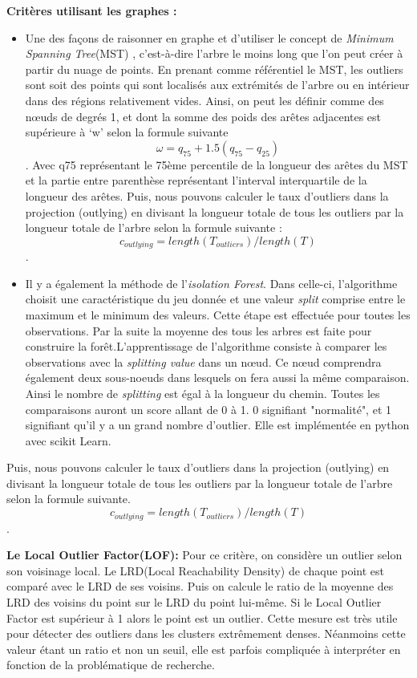 \textbf{Critères utilisant les graphes :}
\begin{itemize}
    \item Une des façons de raisonner en graphe et d'utiliser le concept de \textit{Minimum Spanning Tree}(MST) \cite{wilkinson2005graph-MST} , c'est-à-dire l'arbre le moins long que l'on peut créer à partir du nuage de points. 
    En prenant comme référentiel le MST, les outliers sont soit des points qui sont localisés aux extrémités de l’arbre ou en intérieur dans des régions relativement vides. 
    Ainsi, on peut les définir comme des nœuds de degrés 1, et dont la somme des poids des arêtes adjacentes est supérieure à ‘w’ selon la formule suivante  \[ \omega = q_{75} + 1.5 (q_{75} - q_{25} ) \].
    Avec q75 représentant le 75ème percentile de la longueur des arêtes du MST et la partie entre parenthèse représentant l'interval interquartile de la longueur des arêtes.
    Puis, nous pouvons calculer le taux d’outliers dans la projection (outlying) en divisant la longueur totale de tous les outliers par la longueur totale de l’arbre selon la formule suivante : \[c_{outlying} = length(T_{outliers} )/length(T) \] .
    \item Il y a également la méthode de l’\textit{isolation Forest}. Dans celle-ci, l’algorithme choisit une caractéristique du jeu donnée et une valeur \textit{split} comprise entre le maximum et le minimum des valeurs. Cette étape est effectuée pour toutes les observations. Par la suite la moyenne des tous les arbres est faite pour construire la forêt.L'apprentissage de l’algorithme consiste à comparer les observations avec la \textit{splitting value} dans un nœud. Ce nœud comprendra également deux sous-noeuds dans lesquels on fera aussi la même comparaison. Ainsi le nombre de \textit{splitting} est égal à la longueur du chemin. Toutes les comparaisons auront un score allant de 0 à 1. 0 signifiant "normalité", et 1 signifiant qu’il y a un grand nombre d’outlier\cite{togbe2020anomaly-IsolationForest}. Elle est implémentée en python avec scikit Learn.
\end{itemize} 

Puis, nous pouvons calculer le taux d’outliers dans la projection (outlying) en divisant la
longueur totale de tous les outliers par la longueur totale de l’arbre selon la formule suivante.
\[c_{outlying} = length(T_{outliers} )/length(T) \].

\smallskip

\textbf{Le Local Outlier Factor(LOF):}
\smallskip
Pour ce critère, on considère un outlier selon son voisinage local\cite{breunig2000lof}.
Le LRD(Local Reachability Density) de chaque point est comparé avec le LRD de ses voisins. Puis on calcule le ratio de la moyenne des LRD des voisins du point sur le LRD du point lui-même. Si le Local Outlier Factor est supérieur à 1 alors le point est un outlier.
Cette mesure est très utile pour détecter des outliers dans les clusters extrêmement denses. Néanmoins cette valeur étant un ratio et non un seuil, elle est parfois compliquée à interpréter en fonction de la problématique de recherche.


